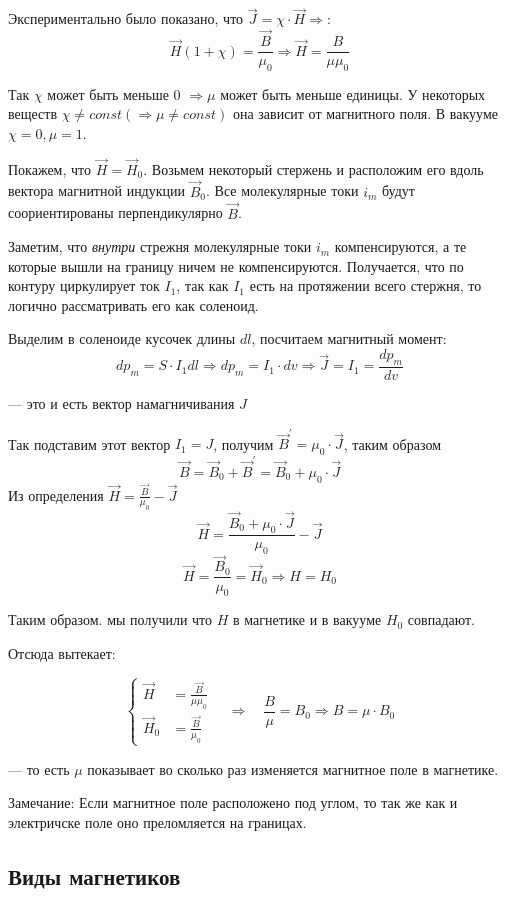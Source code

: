 \documentclass[../main.tex]{subfiles}
\begin{document}
Экспериментально было показано, что $\vec J = \chi \cdot \vec H \Rightarrow$:
\[\vec H(1+ \chi) = \frac{\vec B}{\mu_0} \Rightarrow \vec H = \frac{B}{\mu \mu_0}\]

Так $\chi$ может быть меньше 0 $\Rightarrow \mu $ может быть меньше единицы. У некоторых веществ $\chi \neq const (\Rightarrow \mu \neq const )$ она зависит от магнитного поля.
В вакууме $\chi = 0, \mu = 1$.

Покажем, что $\vec H = \vec H_0$. Возьмем некоторый стержень и расположим его вдоль вектора магнитной индукции $\vec B_0$. Все молекулярные токи $i_m$ будут соориентированы перпендикулярно $\vec B$.

Заметим, что \textit{внутри} стрежня молекулярные токи $i_m$ компенсируются, а те которые вышли на границу ничем не компенсируются. Получается, что по контуру 
циркулирует ток $I_1$, так как $I_1$ есть на протяжении всего стержня, то логично рассматривать его как соленоид.

Выделим в соленоиде кусочек длины $dl$, посчитаем магнитный момент:
\[dp_m = S \cdot I_1 dl \Rightarrow dp_m = I_1 \cdot dv \Rightarrow \vec J = I_1 = \frac{dp_m}{dv}\]
\begin{center}
    --- это и есть вектор намагничивания $J$
\end{center}
Так подставим этот вектор $I_1 = J$, получим $\vec B^{\prime} = \mu_0 \cdot \vec J$, таким образом 
\[\vec B = \vec B_0 + \vec B^{\prime} = \vec B_0 + \mu_0 \cdot \vec J\]
Из определения $\vec H = \frac{\vec B}{\mu_0} - \vec J$
\[\vec H = \frac{\vec B_0 + \mu_0 \cdot \vec J }{\mu_0} - \vec J\]
\[\vec H = \frac{\vec B_0}{\mu_0} = \vec H_0 \Rightarrow H = H_0\]

Таким образом. мы получили что $H$ в магнетике и в вакууме $H_0$ совпадают.

Отсюда вытекает:

\[
\left\{
\begin{aligned}
    \vec H &= \frac{\vec B}{\mu \mu_0} \\
    \vec H_0 &= \frac{\vec B}{\mu_0}
\end{aligned}
\right.
\quad \Rightarrow \quad
\frac{B}{\mu} = B_0 \Rightarrow B = \mu \cdot B_0
\]
\begin{center}
    --- то есть $ \mu$ показывает во сколько раз изменяется магнитное поле в магнетике.
\end{center}

Замечание: Если магнитное поле расположено под углом, то так же как и электричске поле оно преломляется на границах.
\subsection{Виды магнетиков}
\end{document}
